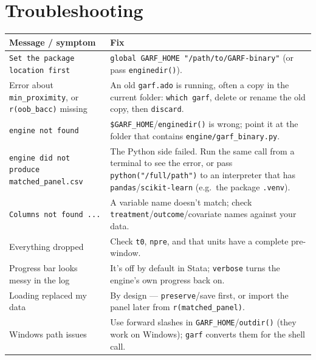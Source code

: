\documentclass[11pt,a4paper]{article}
\newcommand{\code}[1]{\texttt{#1}}
\begin{document}
\section{Troubleshooting}

\begin{tabularx}{\textwidth}{@{}lX@{}}
\toprule
Message / symptom & Fix\\
\midrule
\code{Set the package location first} & \code{global GARF\_HOME "/path/to/GARF-binary"} (or pass \code{enginedir()}).\\
Error about \code{min\_proximity}, or \code{r(oob\_bacc)} missing & An old \code{garf.ado} is running, often a copy in the current folder: \code{which garf}, delete or rename the old copy, then \code{discard}.\\
\code{engine not found} & \code{\$GARF\_HOME}/\code{enginedir()} is wrong; point it at the folder that contains \code{engine/garf\_binary.py}.\\
\code{engine did not produce matched\_panel.csv} & The Python side failed. Run the same call from a terminal to see the error, or pass \code{python("/full/path")} to an interpreter that has \code{pandas}/\code{scikit-learn} (e.g.\ the package \code{.venv}).\\
\code{Columns not found ...} & A variable name doesn't match; check \code{treatment}/\code{outcome}/covariate names against your data.\\
Everything dropped & Check \code{t0}, \code{npre}, and that units have a complete pre-window.\\
Progress bar looks messy in the log & It's off by default in Stata; \code{verbose} turns the engine's own progress back on.\\
Loading replaced my data & By design --- \code{preserve}/save first, or import the panel later from \code{r(matched\_panel)}.\\
Windows path issues & Use forward slashes in \code{GARF\_HOME}/\code{outdir()} (they work on Windows); \code{garf} converts them for the shell call.\\
\bottomrule
\end{tabularx}
\end{document}
